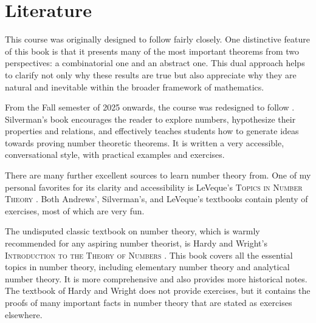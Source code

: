 
\section*{Literature}

This course was originally designed to follow \cite{andrews1994} fairly closely. One distinctive feature of this book is that it presents many of the most important theorems from two perspectives: a combinatorial one and an abstract one. This dual approach helps to clarify not only why these results are true but also appreciate why they are natural and inevitable within the broader framework of mathematics.

From the Fall semester of 2025 onwards, the course was redesigned to follow \cite{silverman2012}. Silverman's book encourages the reader to explore numbers, hypothesize their properties and relations, and effectively teaches students how to generate ideas towards proving number theoretic theorems. It is written a very accessible, conversational style, with practical examples and exercises.

There are many further excellent sources to learn number theory from. One of my personal favorites for its clarity and accessibility is LeVeque's \textsc{Topics in Number Theory} \cite{leveque1956vol1,leveque1956vol2}. Both Andrews', Silverman's, and LeVeque's textbooks contain plenty of exercises, most of which are very fun.

The undisputed classic textbook on number theory, which is warmly recommended for any aspiring number theorist, is Hardy and Wright's \textsc{Introduction to the Theory of Numbers} \cite{hardy2008}. This book covers all the essential topics in number theory, including elementary number theory and analytical number theory. It is more comprehensive and also provides more historical notes. The textbook of Hardy and Wright does not provide exercises, but it contains the proofs of many important facts in number theory that are stated as exercises elsewhere.

